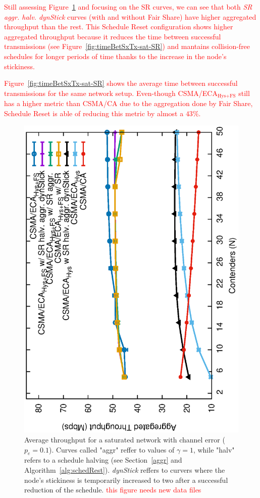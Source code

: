 	\textcolor{red}{Still assessing Figure~\ref{fig:throughput-sat-SR} and focusing on the SR curves, we can see that both \emph{SR aggr. halv. dynStick} curves (with and without Fair Share) have higher aggregated throughput than the rest. This Schedule Reset configuration shows higher aggregated throughput because it reduces the time between successful transmissions (see Figure~\ref{fig:timeBetSxTx-sat-SR}) and mantains collision-free schedules for longer periods of time thanks to the increase in the node's stickiness.}
	
	\textcolor{red}{Figure~\ref{fig:timeBetSxTx-sat-SR} shows the average time between successful transmissions for the same network setup. Even-though CSMA/ECA$_{\text{Hys+FS}}$ still has a higher metric than CSMA/CA due to the aggregation done by Fair Share, Schedule Reset is able of reducing this metric by almost a $43\%$.}
	
	\begin{figure}[tb]
		\centering
		\includegraphics[width=0.7\linewidth,angle=-90]{figures/tonFigs/throughput-sat-SR-TON.eps}
		\caption{Average throughput for a saturated network with channel error ($p_e=0.1$). Curves called "aggr" reffer to values of $\gamma=1$, while "halv" refers to a schedule halving (see Section~\ref{aggr} and Algorithm~\ref{alg:schedRest}). \emph{dynStick} reffers to curvers where the node's stickiness is temporarily increased to two after a successful reduction of the schedule. \textcolor{red}{this figure needs new data files}}
		\label{fig:throughput-sat-SR}
	\end{figure}
	
